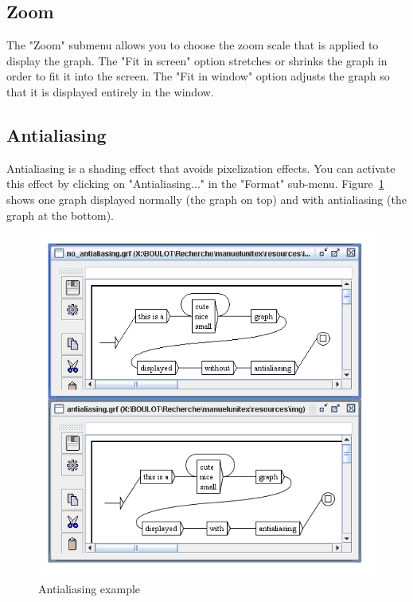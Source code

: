 \subsection{Zoom}
The "Zoom" submenu allows you to choose the zoom scale that is applied to display the graph.
\noindent The "Fit in screen" option stretches or shrinks the graph in order to fit it into the screen. The "Fit in window" option adjusts the graph so that it is displayed entirely in the window.

\clearpage
\subsection{Antialiasing}
Antialiasing is a shading effect that avoids pixelization
effects. You can activate this effect by clicking on
"Antialiasing..." in the "Format" sub-menu. Figure~\ref{fig-antialiasing}
shows one graph displayed normally (the graph on top) and with antialiasing (the
graph at the bottom).

\bigskip
\begin{figure}[!ht]
\begin{center}
\includegraphics[width=13.5cm]{resources/img/fig5-22.png}
\caption{Antialiasing example\label{fig-antialiasing}}
\end{center}
\end{figure}

